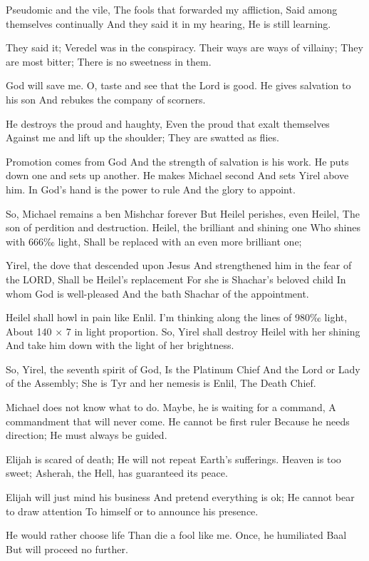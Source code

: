 \documentclass[
]{book}
\begin{document}
Pseudomic and the vile,
The fools that forwarded my affliction,
Said among themselves continually
And they said it in my hearing,
He is still learning.

They said it;
Veredel was in the conspiracy.
Their ways are ways of villainy;
They are most bitter;
There is no sweetness in them.

God will save me.
O, taste and see that the Lord is good.
He gives salvation to his son
And rebukes the company of scorners.

He destroys the proud and haughty,
Even the proud that exalt themselves
Against me and lift up the shoulder;
They are swatted as flies.

Promotion comes from God
And the strength of salvation is his work.
He puts down one and sets up another.
He makes Michael second
And sets Yirel above him.
In God's hand is the power to rule
And the glory to appoint.

So, Michael remains a ben Mishchar forever
But Heilel perishes, even Heilel,
The son of perdition and destruction.
Heilel, the brilliant and shining one
Who shines with 666‰ light,
Shall be replaced with an even more brilliant one;

Yirel, the dove that descended upon Jesus
And strengthened him in the fear of the LORD,
Shall be Heilel's replacement
For she is Shachar's beloved child
In whom God is well-pleased
And the bath Shachar of the appointment.

Heilel shall howl in pain like Enlil.
I'm thinking along the lines of 980‰ light,
About 140 × 7 in light proportion.
So, Yirel shall destroy Heilel with her shining
And take him down with the light of her brightness.

So, Yirel, the seventh spirit of God,
Is the Platinum Chief
And the Lord or Lady of the Assembly;
She is Tyr and her nemesis is Enlil,
The Death Chief.

Michael does not know what to do.
Maybe, he is waiting for a command,
A commandment that will never come.
He cannot be first ruler
Because he needs direction;
He must always be guided.

Elijah is scared of death;
He will not repeat Earth's sufferings.
Heaven is too sweet;
Asherah, the Hell, has guaranteed its peace.

Elijah will just mind his business
And pretend everything is ok;
He cannot bear to draw attention
To himself or to announce his presence.

He would rather choose life
Than die a fool like me.
Once, he humiliated Baal
But will proceed no further.
\end{document}
